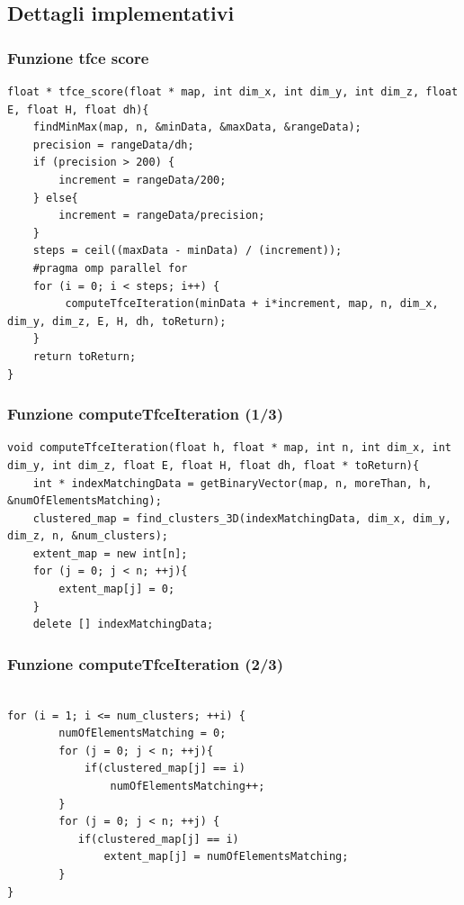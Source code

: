 \documentclass{beamer}
\begin{document}
\subsection{Dettagli implementativi}
\begin{frame}[fragile]
\frametitle{Funzione tfce score}
\begin{center}
\begin{lstlisting}
float * tfce_score(float * map, int dim_x, int dim_y, int dim_z, float E, float H, float dh){
	findMinMax(map, n, &minData, &maxData, &rangeData);
	precision = rangeData/dh;
	if (precision > 200) {
		increment = rangeData/200;
	} else{
		increment = rangeData/precision;	
	}
	steps = ceil((maxData - minData) / (increment));
	#pragma omp parallel for
	for (i = 0; i < steps; i++) {
		 computeTfceIteration(minData + i*increment, map, n, dim_x, dim_y, dim_z, E, H, dh, toReturn);
	}	
	return toReturn;
}
\end{lstlisting}
\end{center}
\end{frame}

\begin{frame}[fragile]
\frametitle{Funzione computeTfceIteration (1/3)}
\begin{center}
\begin{lstlisting}
void computeTfceIteration(float h, float * map, int n, int dim_x, int dim_y, int dim_z, float E, float H, float dh, float * toReturn){
	int * indexMatchingData = getBinaryVector(map, n, moreThan, h, &numOfElementsMatching);
	clustered_map = find_clusters_3D(indexMatchingData, dim_x, dim_y, dim_z, n, &num_clusters);
	extent_map = new int[n];
	for (j = 0; j < n; ++j){
		extent_map[j] = 0;
	}
	delete [] indexMatchingData;
\end{lstlisting}
\end{center}
\end{frame}

\begin{frame}[fragile]
\frametitle{Funzione computeTfceIteration (2/3)}
\begin{center}
\begin{lstlisting}

for (i = 1; i <= num_clusters; ++i) {
		numOfElementsMatching = 0;	
		for (j = 0; j < n; ++j){
		    if(clustered_map[j] == i)
		        numOfElementsMatching++; 
		}
		for (j = 0; j < n; ++j) {
		   if(clustered_map[j] == i)
		       extent_map[j] = numOfElementsMatching; 
		}
}
		      
\end{lstlisting}
\end{center}
\end{frame}
\end{document}
